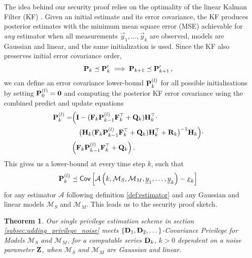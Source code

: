\documentclass[letterpaper, 10 pt, conference]{ieeeconf}
\newtheorem{theorem}{Theorem}[section]
\begin{document}
The idea behind our security proof relies on the optimality of the linear Kalman Filter (KF) \cite{haugBayesianEstimationTracking2012}. Given an initial estimate and its error covariance, the KF produces posterior estimates with the minimum mean square error (MSE) achievable for \textit{any} estimator when all measurements $\vec{y}_1,\dots,\vec{y}_k$ are observed, models are Gaussian and linear, and the same initialization is used. Since the KF also preserves initial error covariance order,
\begin{equation}
   {\ensuremath{{\mathbf{P}}}}_k \preceq {\ensuremath{{\mathbf{P}}}}_k^\prime \implies {\ensuremath{{\mathbf{P}}}}_{k+1} \preceq {\ensuremath{{\mathbf{P}}}}_{k+1}^\prime\,,
\end{equation}
we can define an error covariance lower-bound ${{\mathbf{P}}}_k^{(l)}$ for all possible initialisations by setting ${{\mathbf{P}}}_0^{(l)} = {{\mathbf{0}}}$ and computing the posterior KF error covariance using the combined predict and update equations
\begin{equation}\label{eqn:lower_bound_error_cov}
   \begin{split}
      {\ensuremath{{\mathbf{P}}}}_k^{(l)} =& \Bigl( {{\mathbf{I}}} - ({{\mathbf{F}}}_k{{\mathbf{P}}}_{k-1}^{(l)}{{\mathbf{F}}}_k^\top + {{\mathbf{Q}}}_k){{\mathbf{H}}}_k^\top \cdot \\
      &\quad\bigl({{\mathbf{H}}}_k({{\mathbf{F}}}_k{{\mathbf{P}}}_{k-1}^{(l)}{{\mathbf{F}}}_k^\top + {{\mathbf{Q}}}_k){{\mathbf{H}}}_k^\top + {{\mathbf{R}}}_k\bigr)^{-1}{{\mathbf{H}}}_k\Bigr)\cdot\\
      &\Bigl({{\mathbf{F}}}_k{{\mathbf{P}}}_{k-1}^{(l)}{{\mathbf{F}}}_k^\top + {{\mathbf{Q}}}_k\Bigr)\,.
   \end{split}
\end{equation}
This gives us a lower-bound at every time step $k$, such that
\begin{equation}
   {\ensuremath{{\mathbf{P}}}}_k^{(l)} \preceq \mathsf{Cov}\left[\mathcal{A}\left(k, \mathcal{M}_S, \mathcal{M}_M, {\underline{y}}_1,\dots,{\underline{y}}_k\right) - {\underline{x}}_k \right]
\end{equation}
for any estimator $\mathcal{A}$ following definition \ref{def:estimator} and any Gaussian and linear models $\mathcal{M}_S$ and $\mathcal{M}_M$. This leads us to the security proof sketch.

\begin{theorem}\label{thm:prooved_thm}
   Our single privilege estimation scheme in section \ref{subsec:adding_privilege_noise} meets $\{{{\mathbf{D}}}_1,{{\mathbf{D}}}_2,\dots\}$-Covariance Privilege for Models $\mathcal{M}_S$ and $\mathcal{M}_M$, for a computable series ${{\mathbf{D}}}_k$, $k>0$ dependent on a noise parameter ${{\mathbf{Z}}}$, when $\mathcal{M}_S$ and $\mathcal{M}_M$ are Gaussian and linear.
\end{theorem}
\end{document}
